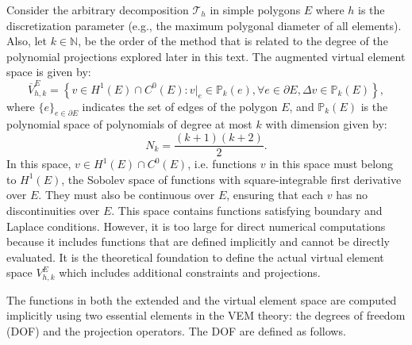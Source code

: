 \documentclass{article}
\begin{document}
Consider the arbitrary decomposition $\mathcal{T}_h$ in simple polygons $E$ where $h$ is the discretization parameter (e.g., the maximum polygonal diameter of all elements). Also, let $k \in \mathbb{N}$, be the order of the method that is related to the degree of the polynomial projections explored later in this text. The augmented virtual element space is given by:
\begin{equation}\label{eq:augmented_virtual_space}
    \overline{V}^E_{h,k} = \left\{ v \in H^1(E) \cap C^0(E)  :v|_e \in \mathbb{P}_k(e), \forall e\in\partial E, \Delta v \in \mathbb{P}_k(E)  \right\},
\end{equation}
where $\{ e \}_{e \in \partial E}$ indicates the set of edges of the polygon $E$, and $\mathbb{P}_k(E)$ is the polynomial space of polynomials of degree at most $k$ with dimension given by:
\begin{equation}\label{eq:polynomial_space_dim}
    N_k = \frac{(k+1)(k+2)}{2}.
\end{equation}
In this space, $v \in H^1(E) \cap C^0(E)$, i.e. functions $v$ in this space must belong to $H^1(E)$, the Sobolev space of functions with square-integrable first derivative over $E$. They must also be continuous over $E$, ensuring that each $v$ has no discontinuities over $E$. This space contains functions satisfying boundary and Laplace conditions. However, it is too large for direct numerical computations because it includes functions that are defined implicitly and cannot be directly evaluated. It is the theoretical foundation to define the actual virtual element space $V^E_{h,k}$ which includes additional constraints and projections. 

The functions in both the extended and the virtual element space are computed implicitly using two essential elements in the VEM theory: the degrees of freedom (DOF) and the projection operators. The DOF are defined as follows.
\end{document}

